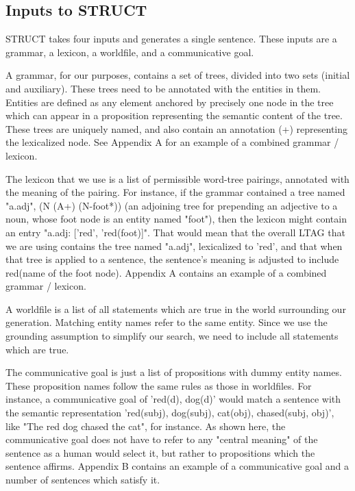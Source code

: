\subsection{Inputs to STRUCT}

STRUCT takes four inputs and generates a single sentence.  These inputs are a grammar,
a lexicon, a worldfile, and a communicative goal.

A grammar, for our purposes, contains a set of trees, divided into two sets (initial and auxiliary).
These trees need to be annotated with the entities in them.  Entities are defined as any element
anchored by precisely one node in the tree which can appear in a proposition representing the
semantic content of the tree.  These trees are uniquely named, and also contain an
annotation (+) representing the lexicalized node.  See Appendix A for an example of a combined
grammar / lexicon.

The lexicon that we use is a list of permissible word-tree pairings, annotated with the meaning of
the pairing.  For instance, if the grammar contained a tree named "a.adj", (N (A+) (N-foot*))
(an adjoining tree for prepending an adjective to a noun, whose foot node is an entity named "foot"),
then the lexicon might contain an entry "a.adj: ['red', 'red(foot)]".  That would mean that the overall
LTAG that we are using contains the tree named "a.adj", lexicalized to 'red', and that when that tree
is applied to a sentence, the sentence's meaning is adjusted to include red(name of the foot node).
Appendix A contains an example of a combined grammar / lexicon.

A worldfile is a list of all statements which are true in the world surrounding our generation.
Matching entity names refer to the same entity.  Since we use the grounding assumption
to simplify our search, we need to include all statements which are true.

The communicative goal is just a list of propositions with dummy entity names.
These proposition names follow the same rules as those in worldfiles.
For instance, a communicative goal of 'red(d), dog(d)' would match a sentence 
with the semantic representation 'red(subj), dog(subj), cat(obj), chased(subj, obj)',
like "The red dog chased the cat", for instance.
As shown here, the communicative goal does not have to refer to any "central meaning" of the sentence as a human would select it, but rather
to propositions which the sentence affirms.  Appendix B contains an example of a communicative
goal and a number of sentences which satisfy it.

